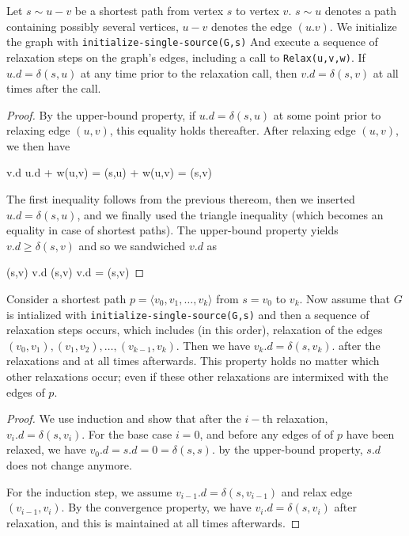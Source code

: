 \begin{theorem}
  Let $s \sim u - v$ be a shortest path from vertex $s$ to vertex $v$. $s \sim u$ denotes a path containing possibly several vertices, $u-v$ denotes the edge $(u.v)$. We initialize the graph with \verb|initialize-single-source(G,s)| And execute a sequence of relaxation steps on the graph's edges, including a call to \verb|Relax(u,v,w)|. If $u.d = \delta(s,u)$ at any time prior to the relaxation call, then $v.d = \delta(s,v)$ at all times after the call.
\end{theorem}

\begin{proof}
  By the upper-bound property, if $u.d = \delta(s,u)$ at some point prior to relaxing edge $(u,v)$, this equality holds thereafter. After relaxing edge $(u,v)$, we then have

  \bee
  v.d \leq u.d + w(u,v) = \delta(s,u) + w(u,v) = \delta(s,v)
  \eee

  The first inequality follows from the previous thereom, then we inserted $u.d = \delta(s,u)$, and we finally used the triangle inequality (which becomes an equality in case of shortest paths). The upper-bound property yields $v.d \geq \delta(s,v)$ and so we sandwiched $v.d$ as

  \bee
  \delta(s,v) \leq v.d \leq \delta(s,v) \rightarrow v.d = \delta(s,v)
  \eee
\end{proof}

\begin{theorem}
Consider a shortest path $p = \langle v_0, v_1, \ldots, v_k \rangle$ from $s=v_0$ to $v_k$. Now assume that $G$ is intialized with \verb|initialize-single-source(G,s)| and then a sequence of relaxation steps occurs, which includes (in this order), relaxation of the edges $(v_0, v_1), (v_1, v_2), \ldots, (v_{k-1},v_k)$. Then we have $v_k.d=\delta(s,v_k)$. after the relaxations and at all times afterwards. This property holds no matter which other relaxations occur; even if these other relaxations are intermixed with the edges of $p$.
\end{theorem}

\begin{proof}
  We use induction and show that after the $i-$th relaxation, $v_i.d = \delta(s, v_i)$. For the base case $i=0$, and before any edges of of $p$ have been relaxed, we have $v_0.d=s.d=0=\delta(s,s)$. by the upper-bound property, $s.d$ does not change anymore.

  For the induction step, we assume $v_{i-1}.d=\delta(s,v_{i-1})$ and relax edge $(v_{i-1},v_i)$. By the convergence property, we have $v_i.d=\delta(s,v_i)$ after relaxation, and this is maintained at all times afterwards.
\end{proof}


